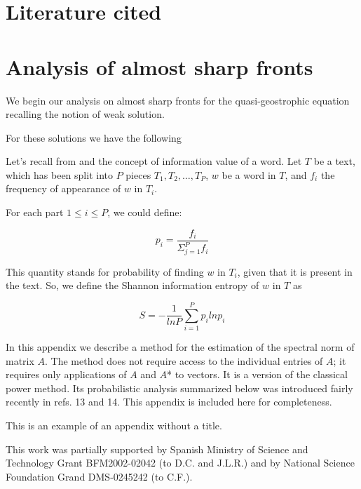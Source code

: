 \documentclass{pnastwo}
\begin{document}
\begin{article}
\section{Literature cited}



\section{Analysis of almost sharp fronts}
We begin our analysis on almost sharp fronts for the
quasi-geostrophic equation recalling the notion of weak solution.

For these solutions we have the following



Let's recall from \cite{DARWIN} and \cite{ENTROPIC} the concept of information value of a word. 
Let $T$ be a text, which has been split into $P$ pieces $T_1, T_2, \dots, T_P$, $w$ be a word in $T$,
and $f_i$ the frequency of appearance of $w$ in $T_i$.

For each part $1 \leq i \leq P$, we could define:

\begin{equation}
  p_i = \frac{f_i}{\Sigma_{j=1}^{P}f_i}
\end{equation}

This quantity stands for probability of finding $w$ in $T_i$, given that it is present in the text. So, 
we define the Shannon information entropy of $w$ in $T$ as

\begin{equation}
  S = -\frac{1}{ln P}\sum_{i=1}^{P}p_i ln p_i
\end{equation}


In this appendix we describe a method for the estimation of the spectral norm
of matrix $A$. The method does not require access to the individual
entries of $A$; it requires only applications of $A$ and $A$* to vectors.
It is a version of the classical power method. Its probabilistic
analysis summarized below was introduced fairly recently in refs. 13
and 14. This appendix is included here for completeness.


\appendix
This is an example of an appendix without a title.

\begin{acknowledgments}
This work was partially supported by 
Spanish Ministry of Science and Technology Grant BFM2002-02042 (to D.C. and
J.L.R.) and by National Science Foundation Grand DMS-0245242 (to C.F.).
\end{acknowledgments}




\end{article}
\end{document}
